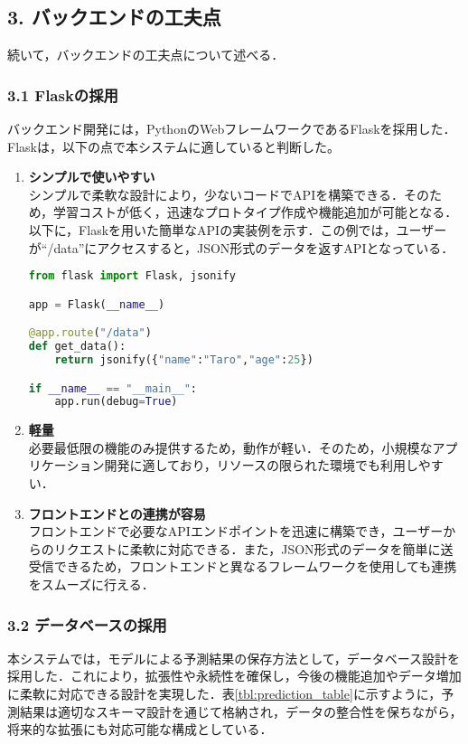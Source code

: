 \subsection*{3. バックエンドの工夫点}

続いて，バックエンドの工夫点について述べる．

\subsubsection*{3.1 Flaskの採用}
バックエンド開発には，PythonのWebフレームワークであるFlaskを採用した．Flaskは，以下の点で本システムに適していると判断した。

\begin{enumerate}
	\item {\bfseries シンプルで使いやすい}\\	
	シンプルで柔軟な設計により，少ないコードでAPIを構築できる．そのため，学習コストが低く，迅速なプロトタイプ作成や機能追加が可能となる．以下に，Flaskを用いた簡単なAPIの実装例を示す．この例では，ユーザーが``/data''にアクセスすると，JSON形式のデータを返すAPIとなっている．
\begin{lstlisting}[style=mystyle, language=Python, caption=Flaskによる簡単なAPIの実装例]
from flask import Flask, jsonify

app = Flask(__name__)

@app.route("/data")
def get_data():
	return jsonify({"name":"Taro","age":25})

if __name__ == "__main__":
	app.run(debug=True)
\end{lstlisting}
	
	\item {\bfseries 軽量}\\
	必要最低限の機能のみ提供するため，動作が軽い．そのため，小規模なアプリケーション開発に適しており，リソースの限られた環境でも利用しやすい．

	\item {\bfseries フロントエンドとの連携が容易}\\	 
	フロントエンドで必要なAPIエンドポイントを迅速に構築でき，ユーザーからのリクエストに柔軟に対応できる．また，JSON形式のデータを簡単に送受信できるため，フロントエンドと異なるフレームワークを使用しても連携をスムーズに行える．
\end{enumerate}

\subsubsection*{3.2 データベースの採用}
本システムでは，モデルによる予測結果の保存方法として，データベース設計を採用した．これにより，拡張性や永続性を確保し，今後の機能追加やデータ増加に柔軟に対応できる設計を実現した．表\ref{tbl:prediction_table}に示すように，予測結果は適切なスキーマ設計を通じて格納され，データの整合性を保ちながら，将来的な拡張にも対応可能な構成としている．

